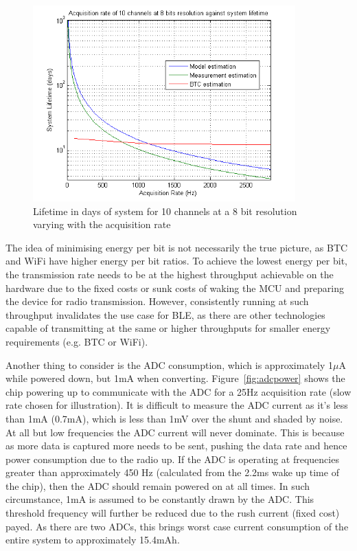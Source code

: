 \documentclass[]{article}
\begin{document}
\begin{figure}[H]
	\begin{center}
		\includegraphics[width = 0.9\textwidth]{lifetime}
	\end{center}
	\caption{Lifetime in days of system for 10 channels at a 8 bit resolution varying with the acquisition rate}
	\label{fig:lifetime}
\end{figure}


The idea of minimising energy per bit is not necessarily the true picture, as \ac{BTC} and WiFi have higher energy per bit ratios. To achieve the lowest energy per bit, the transmission rate needs to be at the highest throughput achievable on the hardware due to the fixed costs or sunk costs of waking the \ac{MCU} and preparing the device for radio transmission. However, consistently running at such throughput invalidates the use case for \ac{BLE}, as there are other technologies capable of transmitting at the same or higher throughputs for smaller energy requirements (e.g. \ac{BTC} or WiFi). 

Another thing to consider is the \ac{ADC} consumption, which is approximately 1$\mu$A while powered down, but 1mA when converting. Figure~\ref{fig:adcpower} shows the chip powering up to communicate with the \ac{ADC} for a 25Hz acquisition rate (slow rate chosen for illustration). It is difficult to measure the \ac{ADC} current as it's less than 1mA (0.7mA), which is less than 1mV over the shunt and shaded by noise. At all but low frequencies the \ac{ADC} current will never dominate. This is because as more data is captured more needs to be sent, pushing the data rate and hence power consumption due to the radio up. If the \ac{ADC} is operating at frequencies greater than approximately 450 Hz (calculated from the 2.2ms wake up time of the chip), then the \ac{ADC} should remain powered on at all times. In such circumstance, 1mA is assumed to be constantly drawn by the \ac{ADC}. This threshold frequency will further be reduced due to the rush current (fixed cost) payed. As there are two \ac{ADC}s, this brings worst case current consumption of the entire system to approximately 15.4mAh.
\end{document}
